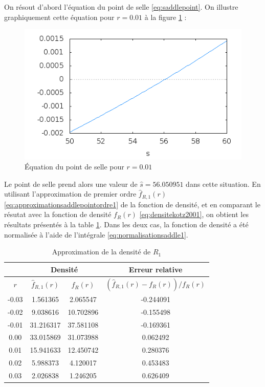On résout d'abord l'équation du point de selle
\eqref{eq:saddlepoint}. On illustre graphiquement cette équation pour
$r=0.01$ à la figure \ref{fig:equationptselle0.01R1} :
\begin{figure}[!ht]
  \centering
  \includegraphics[scale=0.5]{../graphiques/pointdeselleGMM.png}
  \caption{Équation du point de selle pour $r=0.01$}
  \label{fig:equationptselle0.01R1}
\end{figure}

Le point de selle prend alors une valeur de $\hat{s}=56.050951$ dans
cette situation. En utilisant l'approximation de premier ordre
$\hat{f}_{R,1}(r)$
\eqref{eq:approximationsaddlepointordre1} %
de la fonction de densité, et en comparant le résutat avec la fonction
de densité ${f}_{R}(r)$ \eqref{eq:densitekotz2001}, on obtient les
résultats présentés à la table \ref{tab:approximationdensiteR1}. Dans
les deux cas, la fonction de densité a été normalisée à l'aide de
l'intégrale \eqref{eq:normalisationsaddle1}.

\begin{table}[ht]
  \centering
  \begin{tabular}{cccc}
    & \multicolumn{2}{c}{\textbf{Densité}} & \multicolumn{1}{c}{\textbf{Erreur relative}} \\
    \hline
    $r$ & $\hat{f}_{R,1}(r)$ & ${f}_{R}(r)$ & $(\hat{f}_{R,1}(r)-{f}_{R}(r))/{{f}_{R}(r)}$ \\ 
    \hline
    -0.03 & 1.561365 & 2.065547 & -0.244091 \\ 
    -0.02 & 9.038616 & 10.702896 & -0.155498 \\ 
    -0.01 & 31.216317 & 37.581108 & -0.169361 \\ 
    0.00 & 33.015869 & 31.073988 & 0.062492 \\ 
    0.01 & 15.941633 & 12.450742 & 0.280376 \\ 
    0.02 & 5.988373 & 4.120017 & 0.453483 \\ 
    0.03 & 2.026838 & 1.246205 & 0.626409 \\ 
    \hline
  \end{tabular}
  \caption{Approximation de la densité de $R_1$}
  \label{tab:approximationdensiteR1}
\end{table}

